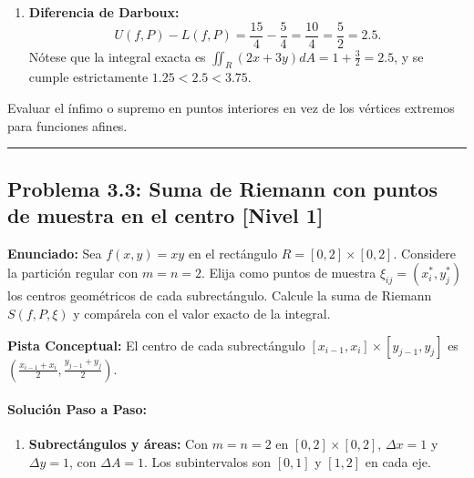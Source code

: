 \documentclass[11pt,a4paper]{article}
\begin{document}
\begin{enumerate}[label=\textbf{\arabic*.}]
\item \textbf{Diferencia de Darboux:}
\begin{equation*}
U(f,P) - L(f,P) = \frac{15}{4} - \frac{5}{4} = \frac{10}{4} = \frac{5}{2} = 2.5.
\end{equation*}
Nótese que la integral exacta es $\iint_R (2x+3y)dA = 1 + \frac{3}{2} = 2.5$, y se cumple estrictamente $1.25 < 2.5 < 3.75$.
\end{enumerate}

\begin{trapbox}
Evaluar el ínfimo o supremo en puntos interiores en vez de los vértices extremos para funciones afines.
\end{trapbox}

\vspace{0.5cm}
\hrule
\vspace{0.5cm}

\subsection*{Problema 3.3: Suma de Riemann con puntos de muestra en el centro \hfill \color{primaryblue}\small[Nivel 1]}

\begin{tcolorbox}[colback=white,colframe=gray!40,arc=1mm,boxrule=0.5pt,left=3mm,right=3mm,top=2mm,bottom=2mm]
\textbf{Enunciado:} Sea $f(x,y) = xy$ en el rectángulo $R = [0, 2] \times [0, 2]$. Considere la partición regular con $m = n = 2$. Elija como puntos de muestra $\xi_{ij} = (x_i^*, y_j^*)$ los centros geométricos de cada subrectángulo. Calcule la suma de Riemann $S(f, P, \xi)$ y compárela con el valor exacto de la integral.
\end{tcolorbox}

\begin{tcolorbox}[colback=yellow!4,colframe=accentamber!70,arc=1mm,boxrule=0.5pt,left=3mm,right=3mm,top=1.5mm,bottom=1.5mm]
\textbf{Pista Conceptual:} El centro de cada subrectángulo $[x_{i-1}, x_i] \times [y_{j-1}, y_j]$ es $(\frac{x_{i-1}+x_i}{2}, \frac{y_{j-1}+y_j}{2})$.
\end{tcolorbox}

\paragraph{Solución Paso a Paso:}\par
\begin{enumerate}[label=\textbf{\arabic*.}]
\item \textbf{Subrectángulos y áreas:}
Con $m=n=2$ en $[0,2]\times[0,2]$, $\Delta x = 1$ y $\Delta y = 1$, con $\Delta A = 1$.
Los subintervalos son $[0,1]$ y $[1,2]$ en cada eje.
\end{enumerate}
\end{document}
